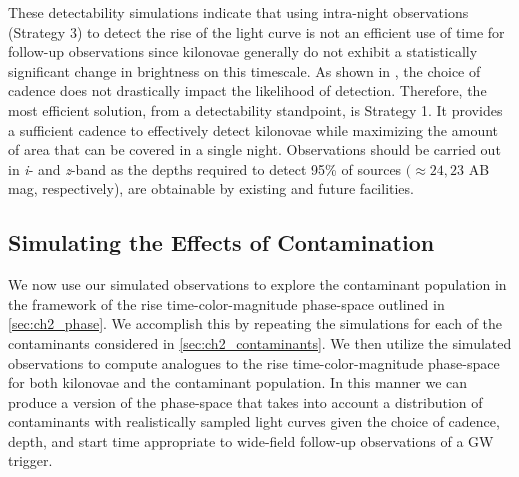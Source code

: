 These detectability simulations indicate that using intra-night observations (Strategy 3) to detect the rise of the light curve is not an efficient use of time for follow-up observations since kilonovae generally do not exhibit a statistically significant change in brightness on this timescale. As shown in , the choice of cadence does not drastically impact the likelihood of detection. Therefore, the most efficient solution, from a detectability standpoint, is Strategy 1. It provides a sufficient cadence to effectively detect kilonovae while maximizing the amount of area that can be covered in a single night. Observations should be carried out in {\em i}- and {\em z}-band as the depths required to detect 95\% of sources $(\approx 24,23$ AB mag, respectively), are obtainable by existing and future facilities.

\subsection{Simulating the Effects of Contamination}
\label{sec:ch2_MCsims_cont}

We now use our simulated observations to explore the contaminant population in the framework of the rise time-color-magnitude phase-space outlined in \cref{sec:ch2_phase}. We accomplish this by repeating the simulations for each of the contaminants considered in \cref{sec:ch2_contaminants}. We then utilize the simulated observations to compute analogues to the rise time-color-magnitude phase-space for both kilonovae and the contaminant population. In this manner we can produce a version of the phase-space that takes into account a distribution of contaminants with realistically sampled light curves given the choice of cadence, depth, and start time appropriate to wide-field follow-up observations of a GW trigger.

